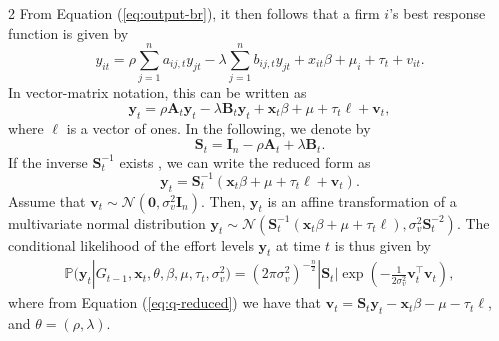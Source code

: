 \documentclass[12pt]{article}
\begin{document}
\begin{spacing}{2}
From Equation (\ref{eq:output-br}), it then follows that a firm $i$'s best response function is given by
$$
y_{it}
=
\rho \sum_{j=1}^{n} a_{ij,t} y_{jt} 
-
\lambda \sum_{j=1}^{n} b_{ij,t} y_{jt} 
+ 
x_{it} \beta
+
\mu_i
+
\tau_t
+
v_{it}.
$$
In vector-matrix notation, this can be written as
\begin{equation}
\mathbf{y}_{t} = \rho \mathbf{A}_t \mathbf{y}_{t} - \lambda \mathbf{B}_t \mathbf{y}_{t} +  \mathbf{x}_{t}\beta  + \mu + \tau_t\ell + \mathbf{v}_{t},
\label{eq:equilbrium_output}
\end{equation}
where $\ell$ is a vector of ones. 
In the following, we denote by
$$
\mathbf{S}_t = \mathbf{I}_n - \rho \mathbf{A}_t + \lambda \mathbf{B}_t.
$$
If the inverse $\mathbf{S}_t^{-1}$ exists \citep[see e.g.][for sufficient conditions]{Konig2018}, we can write the reduced form as
\begin{equation}
\mathbf{y}_{t} = \mathbf{S}_t^{-1} (\mathbf{x}_{t} \beta + \mu + \tau_t\ell + \mathbf{v}_{t}).
\label{eq:q-reduced}
\end{equation}
Assume that $\mathbf{v}_{t} \sim \mathcal{N}(\bm{0},  \sigma_v^2 \mathbf{I}_n)$. Then, $\mathbf{y}_{t}$ is an affine transformation of a multivariate normal distribution
$
\mathbf{y}_{t} \sim 
\mathcal{N}(\mathbf{S}_t^{-1} (\mathbf{x}_{t} \beta + \mu + \tau_t\ell), \sigma_v^2 \mathbf{S}_t^{-2}).
$
The conditional likelihood of the effort levels $\mathbf{y}_{t}$ at time $t$ is thus given by
\begin{align*}
\mathbb{P}(\mathbf{y}_t | G_{t-1},\mathbf{x}_t,\theta,\beta,\mu,\tau_t,\sigma^2_v) =
(2 \pi  \sigma_v^2)^{-\frac{n}{2}} 
|\mathbf{S}_t| 
\exp \left(
-\frac{1}{2 \sigma_v^2}
\mathbf{v}_{t}^\top  
\mathbf{v}_{t}
\right),
\end{align*}
where 
from Equation (\ref{eq:q-reduced}) we have that
$
\mathbf{v}_{t} =
\mathbf{S}_t\mathbf{y}_t - \mathbf{x}_{t} \beta - \mu - \tau_t\ell
$, and $\theta=(\rho,\lambda)$. 


\end{spacing}
\end{document}
